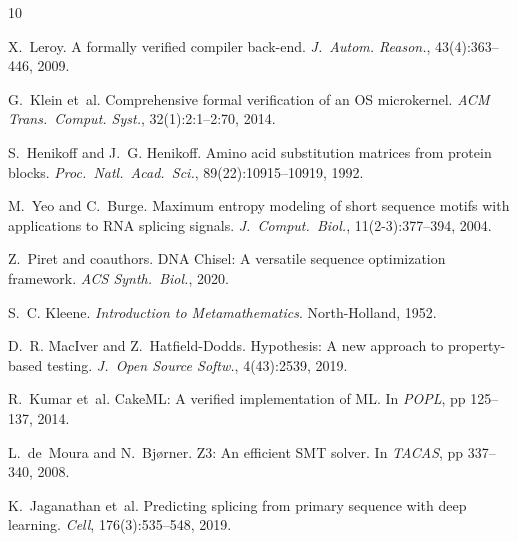 \documentclass[sigplan,10pt,manuscript,review,anonymous]{acmart}
\begin{document}

\begin{thebibliography}{10}

X.~Leroy.
\newblock A formally verified compiler back-end.
\newblock \emph{J.~Autom. Reason.}, 43(4):363--446, 2009.

G.~Klein et~al.
\newblock Comprehensive formal verification of an OS microkernel.
\newblock \emph{ACM Trans.~Comput. Syst.}, 32(1):2:1--2:70, 2014.

S.~Henikoff and J.~G. Henikoff.
\newblock Amino acid substitution matrices from protein blocks.
\newblock \emph{Proc.~Natl.~Acad.~Sci.}, 89(22):10915--10919, 1992.

M.~Yeo and C.~Burge.
\newblock Maximum entropy modeling of short sequence motifs with
applications to RNA splicing signals.
\newblock \emph{J.~Comput.~Biol.}, 11(2-3):377--394, 2004.

Z.~Piret and coauthors.
\newblock DNA Chisel: A versatile sequence optimization framework.
\newblock \emph{ACS Synth.~Biol.}, 2020.

S.~C. Kleene.
\newblock \emph{Introduction to Metamathematics}.
\newblock North-Holland, 1952.

D.~R. MacIver and Z.~Hatfield-Dodds.
\newblock Hypothesis: A new approach to property-based testing.
\newblock \emph{J.~Open Source Softw.}, 4(43):2539, 2019.

R.~Kumar et~al.
\newblock CakeML: A verified implementation of ML.
\newblock In \emph{POPL}, pp 125--137, 2014.

L.~de~Moura and N.~Bj{\o}rner.
\newblock Z3: An efficient SMT solver.
\newblock In \emph{TACAS}, pp 337--340, 2008.

K.~Jaganathan et~al.
\newblock Predicting splicing from primary sequence with deep learning.
\newblock \emph{Cell}, 176(3):535--548, 2019.

\end{thebibliography}
\end{document}
